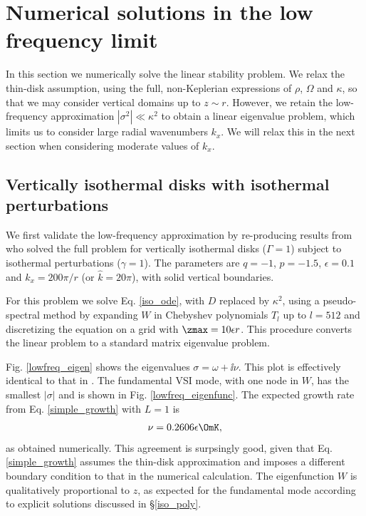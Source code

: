 \section{Numerical solutions in the low frequency limit}
In this section we numerically solve the linear stability problem.  
We relax the thin-disk assumption, using the full, non-Keplerian
expressions of $\rho$, $\Omega$ and $\kappa$, so that we may consider
vertical domains up to $z\sim r$. However, we retain the low-frequency
approximation $|\sigma^2|\ll\kappa^2$ to obtain a linear eigenvalue
problem, which limits us to consider large radial wavenumbers
$k_x$. We will relax this in the next section when considering
moderate values of $k_x$. %



\subsection{Vertically isothermal disks with isothermal
  perturbations}\label{vertiso_pertiso} 
We first validate the low-frequency approximation by re-producing
results from \cite{mcnally14} who solved the full problem for
vertically isothermal disks ($\Gamma=1$) subject to isothermal
perturbations ($\gamma=1$). The parameters are $q=-1$,
$p=-1.5$, $\epsilon=0.1$ and $k_x = 200\pi/r$ (or $\hat{k} = 20\pi$),
with solid vertical boundaries. 

For this problem we solve Eq. \ref{iso_ode}, with $D$ replaced by
$\kappa^2$, using a pseudo-spectral
method by expanding $W$ in Chebyshev polynomials $T_l$ up to $l=512$
and discretizing the equation on a grid with
$\zmax=10\epsilon r$. This procedure converts the linear problem
to a standard matrix eigenvalue problem.   

Fig. \ref{lowfreq_eigen} shows the eigenvalues $\sigma = \omega +
\ii\nu$. This plot is effectively identical to that in
\cite{mcnally14}. The fundamental VSI mode, with one node in $W$, has
the smallest $|\sigma|$ and is shown in Fig. \ref{lowfreq_eigenfunc}.  
The expected growth rate from Eq. \ref{simple_growth} with 
$L=1$ is  
\begin{align*}
  \nu = 0.2606\epsilon\OmK,
\end{align*}
as obtained numerically. This agreement is surpsingly good, given that
Eq. \ref{simple_growth} assumes the thin-disk approximation and
imposes a different boundary condition to that in the numerical
calculation. The eigenfunction $W$ is qualitatively proportional to
$z$, as expected for the fundamental mode according to explicit
solutions discussed in \S\ref{iso_poly}.    

